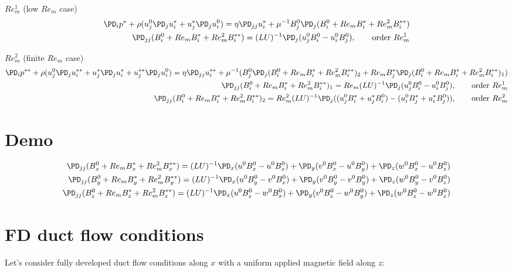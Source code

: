 \documentclass[11pt]{article}
\begin{document}
$Re_m^1$ (low $Re_m$ case)
\begin{equation}\begin{aligned}
\PD_i p^* + \rho (u_j^0 \PD_j u_i^* + u_j^* \PD_j u_i^0) = \eta \PD_{jj} u_i^* + \mu^{-1} B_j^0 \PD_j (B_i^0 + Re_m B_i^* + Re_m^2 B_i^{**}) \\
\PD_{jj} (B_i^0 + Re_m B_i^* + Re_m^2 B_i^{**}) = (LU)^{-1} \PD_j (u_j^0 B_i^0 - u_i^0 B_j^0), \qquad \text{order $Re_m^1$}
\end{aligned}\end{equation}

$Re_m^2$ (finite $Re_m$ case)
\tiny\begin{equation}\begin{aligned}
\PD_i p^{**} + \rho (u_j^0 \PD_j u_i^{**} + u_j^* \PD_j u_i^* + u_j^{**} \PD_j u_i^0) = \eta \PD_{jj} u_i^{**} + \mu^{-1} (B_j^0 \PD_j (B_i^0 + Re_m B_i^* + Re_m^2 B_i^{**})_2 + Re_m B_j^* \PD_j (B_i^0 + Re_m B_i^* + Re_m^2 B_i^{**})_1) \\
\PD_{jj} (B_i^0 + Re_m B_i^* + Re_m^2 B_i^{**})_1 = Re_m (LU)^{-1} \PD_j (u_j^0 B_i^0 - u_i^0 B_j^0), \qquad \text{order $Re_m^1$} \\
\PD_{jj} (B_i^0 + Re_m B_i^* + Re_m^2 B_i^{**})_2 = Re_m^2 (LU)^{-1} \PD_j ((u_j^0 B_i^*+u_j^* B_i^0) - (u_i^0 B_j^*+u_i^* B_j^0)), \qquad \text{order $Re_m^2$} \\
\end{aligned}\end{equation}\normalsize

\section{Demo}
\begin{equation}\begin{aligned}
\PD_{jj} (B_x^0 + Re_m B_x^* + Re_m^2 B_x^{**}) = (LU)^{-1} \PD_x (u^0 B_x^0 - u^0 B_x^0) + \PD_y (v^0 B_x^0 - u^0 B_y^0) + \PD_z (w^0 B_x^0 - u^0 B_z^0) \\
\PD_{jj} (B_y^0 + Re_m B_y^* + Re_m^2 B_y^{**}) = (LU)^{-1} \PD_x (u^0 B_y^0 - v^0 B_x^0) + \PD_y (v^0 B_y^0 - v^0 B_y^0) + \PD_z (w^0 B_y^0 - v^0 B_z^0) \\
\PD_{jj} (B_z^0 + Re_m B_z^* + Re_m^2 B_z^{**}) = (LU)^{-1} \PD_x (u^0 B_z^0 - w^0 B_x^0) + \PD_y (v^0 B_z^0 - w^0 B_y^0) + \PD_z (w^0 B_z^0 - w^0 B_z^0) \\
\end{aligned}\end{equation}


\section{FD duct flow conditions}
Let's consider fully developed duct flow conditions along $x$ with a uniform applied magnetic field along $z$:
\end{document}
